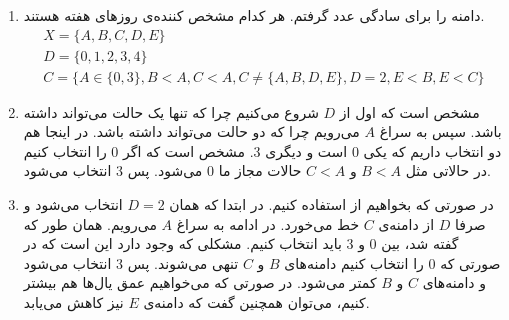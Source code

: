 \begin{enumerate}
    \item دامنه را برای سادگی عدد گرفتم. هر کدام مشخص کننده‌ی روز‌‌های هفته هستند. \begin{gather*}
        X = \{A, B, C, D, E\}\\
        D = \{0, 1, 2, 3, 4\}\\
        C = \{A \in \{0, 3\}, B < A, C < A, C \neq \{A, B, D, E\}, D = 2, E < B, E < C\}
    \end{gather*}
    \item مشخص است که اول از $D$ شروع می‌کنیم چرا که تنها یک حالت می‌تواند داشته باشد. سپس به سراغ
    $A$ می‌رویم چرا که دو حالت می‌تواند داشته باشد. در اینجا هم دو انتخاب داریم که یکی 0 است و دیگری 3.
    مشخص است که اگر 0 را انتخاب کنیم در حالاتی مثل
    $B < A$ و $C < A$
    حالات مجاز ما 0 می‌شود. پس 3 انتخاب می‌شود.
    \item در صورتی که بخواهیم از  استفاده کنیم. در ابتدا که همان $D = 2$ انتخاب می‌شود
    و صرفا $D$ از دامنه‌ی $C$ خط می‌خورد.
    در ادامه به  سراغ $A$ می‌رویم. همان طور که گفته شد، بین 0 و 3 باید انتخاب کنیم. مشکلی که وجود دارد
    این است که در صورتی که 0 را انتخاب کنیم دامنه‌های
    $B$ و $C$
    تنهی می‌شوند. پس 3 انتخاب می‌شود و دامنه‌های 
    $C$ و $B$ کمتر می‌شود. در صورتی که می‌خواهیم عمق یال‌ها هم بیشتر کنیم، می‌توان همچنین گفت که دامنه‌ی
    $E$
    نیز کاهش می‌یابد.
\end{enumerate}